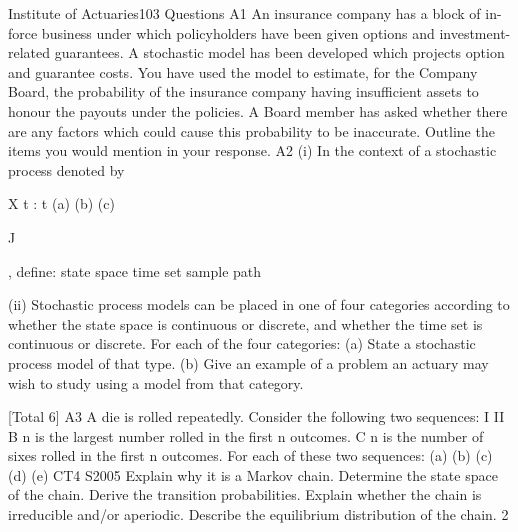 \documentclass[a4paper,12pt]{article}
\begin{document}
\begin{enumerate}

Institute of Actuaries103 Questions
A1
An insurance company has a block of in-force business under which policyholders
have been given options and investment-related guarantees. A stochastic model has
been developed which projects option and guarantee costs. You have used the model
to estimate, for the Company Board, the probability of the insurance company having
insufficient assets to honour the payouts under the policies. A Board member has
asked whether there are any factors which could cause this probability to be
inaccurate.
Outline the items you would mention in your response.
A2
(i)
In the context of a stochastic process denoted by {X t : t
(a)
(b)
(c)

J}, define:
state space
time set
sample path

(ii)
Stochastic process models can be placed in one of four categories according to
whether the state space is continuous or discrete, and whether the time set is
continuous or discrete. For each of the four categories:
(a) State a stochastic process model of that type.
(b) Give an example of a problem an actuary may wish to study using a
model from that category.

[Total 6]
A3
A die is rolled repeatedly. Consider the following two sequences:
I
II
B n is the largest number rolled in the first n outcomes.
C n is the number of sixes rolled in the first n outcomes.
For each of these two sequences:
(a)
(b)
(c)
(d)
(e)
CT4 S2005
Explain why it is a Markov chain.
Determine the state space of the chain.
Derive the transition probabilities.
Explain whether the chain is irreducible and/or aperiodic.
Describe the equilibrium distribution of the chain.
2



\end{enumerate}
\end{document}

